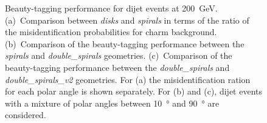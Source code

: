 \begin{figure}[htbp]
\begin{subfigure}[b]{0.33\textwidth}
    \caption{}
    \label{fig:doubleSpirals_doubleSpirals}
  \end{subfigure}
  \caption{Beauty-tagging performance for dijet events at
    \SI{200}{\giga\electronvolt}. (a)~Comparison between \emph{disks}
    and \emph{spirals} in terms of the ratio of the misidentification
    probabilities for charm background. (b)~Comparison of the
    beauty-tagging performance between the \emph{spirals} and
    \emph{double\_spirals} geometries. (c)~Comparison of the
    beauty-tagging performance between the \emph{double\_spirals} and
    \emph{double\_spirals\_v2} geometries. For (a) the
    misidentification ration for each polar angle is shown
    separately. For (b) and (c), dijet events with a mixture of polar
    angles between \SI{10}{\degree} and \SI{90}{\degree} are
    considered.}
  \label{fig:performance}
\end{figure}


